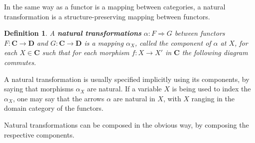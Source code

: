 \documentclass[a5paper,oneside,11pt]{article}
\newtheorem{defn}{Definition}
\newcommand\1{\mathord{\mathrm{1}}}
\newcommand\cat[1]{\mathbf{#1}}
\begin{document}
In the same way as a functor is a mapping between categories, a natural transformation
is a structure-preserving mapping between functors.
\begin{defn}
    \label{defn:natural}
    A \textbf{natural transformations} $\alpha : F \Longrightarrow G$
    between functors $F : \cat{C} \longrightarrow \cat{D}$
    and $G : \cat{C} \longrightarrow \cat{D}$ is a mapping $\alpha_X$, called
    the component of $\alpha$ at $X$, for each $X \in \cat{C}$ such that for each
    morphism $f : X \rightarrow X'$ in $\cat{C}$ the
    following diagram commutes.
    \begin{figure}[H]
        \centering
    \end{figure}
\end{defn}
A natural transformation is usually specified implicitly using its components, by
saying that morphisms $\alpha_X$ are natural. If a variable $X$ is being used
to index the $\alpha_X$, one may say that the arrows $\alpha$ are natural in $X$,
with $X$ ranging in the domain category of the functors.

Natural transformations can be composed in the obvious way, by composing the
respective components.
\end{document}
